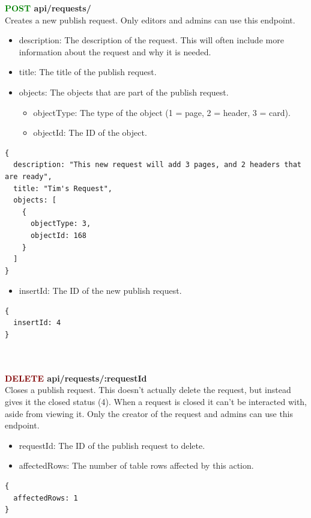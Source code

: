 \documentclass[onecolumn, draftclsnofoot,10pt, compsoc, usenames, dvipsnames]{IEEEtran}
\begin{document}
\noindent
\textbf{\textcolor{Green}{POST} api/requests/} \\
Creates a new publish request. Only editors and admins can use this endpoint.
\begin{itemize}
    \item description: The description of the request. This will often include more information about the request and why it is needed.
    \item title: The title of the publish request.
    \item objects: The objects that are part of the publish request.
    \begin{itemize}
        \item objectType: The type of the object (1 = page, 2 = header, 3 = card).
        \item objectId: The ID of the object.
    \end{itemize}
\end{itemize}
\begin{lstlisting}[caption=Example Request Body]
{ 
  description: "This new request will add 3 pages, and 2 headers that are ready",
  title: "Tim's Request",
  objects: [
    {
      objectType: 3,
      objectId: 168
    }
  ]
}
\end{lstlisting}
\begin{itemize}
    \item insertId: The ID of the new publish request.
\end{itemize}
\begin{lstlisting}[caption=Example Response]
{
  insertId: 4
}
\end{lstlisting}
\\~\\

\noindent
\textbf{\textcolor{Maroon}{DELETE} api/requests/:requestId} \\
Closes a publish request. This doesn't actually delete the request, but instead gives it the closed status (4). When a request is closed it can't be interacted with, aside from viewing it. Only the creator of the request and admins can use this endpoint.
\begin{itemize}
  \item requestId: The ID of the publish request to delete.
  \item affectedRows: The number of table rows affected by this action.
\end{itemize}
\begin{lstlisting}[caption=Example Response]
{ 
  affectedRows: 1
}
\end{lstlisting}
\\~\\
\end{document}
